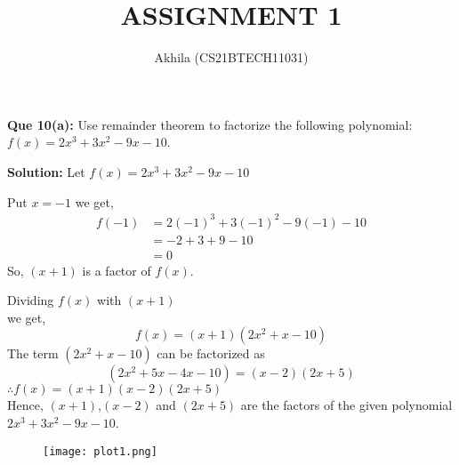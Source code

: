 \documentclass[12pt,twocolumn]{article}
\begin{document}
\large \title{ASSIGNMENT 1}
\author{Akhila (CS21BTECH11031)}
\maketitle
{\Large \textbf  {Que 10(a): }}
Use remainder theorem to factorize the following polynomial:\\
$f(x)=2x^3+3x^2-9x-10$.\\
\vspace{2mm}

{\Large \textbf  {Solution:}}
Let $f(x)=2x^3+3x^2-9x-10$ 

Put $x=-1$ we get,
\begin{align*}
f(-1) & =2(-1)^3+3(-1)^2-9(-1)-10\\
      & =-2+3+9-10\\ 
      & =0
\end{align*}
So, $(x+1)$ is a factor of $f(x)$.

Dividing $f(x)$ with $(x+1)$\\ 
 we get,
\begin{equation*}
    f(x)=(x+1)(2x^2+x-10)
\end{equation*}
The term $(2x^2+x-10)$ can be factorized as
\begin{equation*}
    (2x^2+5x-4x-10)=(x-2)(2x+5)
\end{equation*}
\vspace{5mm}
$\therefore f(x)=(x+1)(x-2)(2x+5)$\\
Hence,  $(x+1)$,$(x-2)$ and $(2x+5)$  are the factors of the given polynomial\\
$2x^3+3x^2-9x-10$.
\begin{figure}
\centering
    \texttt{[image: plot1.png]}
\end{figure}
\end{document}
